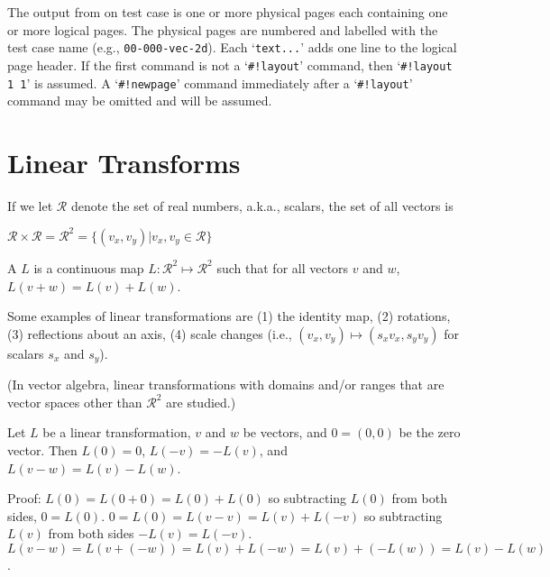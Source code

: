 \documentclass[12pt]{article}
\begin{document}
The output from on test case is one or more physical pages
each containing one or more logical pages.  The physical
pages are numbered and labelled with the test case name
(e.g., {\tt 00-000-vec-2d}).  Each `{\tt text...}' adds one
line to the logical page header.  If the first command is
not a `{\tt \#!layout}' command, then `{\tt \#!layout 1 1}'
is assumed.  A `{\tt \#!newpage}' command immediately after a
`{\tt \#!layout}' command may be omitted and will be assumed.

\newpage

\section{Linear Transforms}
If we let $\mathcal{R}$ denote the set of real numbers,
a.k.a., scalars, the set of all vectors is \\
\centerline{
$\mathcal{R}\times\mathcal{R}=\mathcal{R}^2
    =\{(v_x,v_y)|v_x,v_y\in \mathcal{R}\}$}

\begin{definition}\label{LINEAR-TRANSFORMATION}
A  $L$ is a continuous map
$L:\mathcal{R}^2\mapsto\mathcal{R}^2$ such that for
all vectors $v$ and $w$, $L(v+w)=L(v)+L(w)$.
\end{definition}

Some examples of linear transformations are (1) the identity map,
(2) rotations, (3) reflections about an axis, (4) scale changes
(i.e., $(v_x,v_y)\longmapsto(s_x v_x,s_y v_y)$ for scalars $s_x$
and $s_y$).

(In vector algebra, linear transformations with domains and/or ranges
that are vector spaces other than $\mathcal{R}^2$ are studied.)


\begin{lemma}
Let $L$ be a linear transformation, $v$ and $w$ be vectors,
and $0=(0,0)$ be the zero vector.  Then $L(0)=0$,  $L(-v)=-L(v)$,
and $L(v-w) = L(v) - L(w)$.
\end{lemma}
\begin{indpar}{0.5in}
Proof: $L(0) = L(0+0)= L(0) + L(0)$ so subtracting $L(0)$
from both sides, $0=L(0)$.  $0 = L(0) = L(v-v) = L(v) + L(-v)$
so subtracting $L(v)$ from both sides $-L(v)=L(-v)$.
$L(v-w)=L(v+(-w))=L(v)+L(-w)=L(v)+(-L(w))=L(v)-L(w)$.
\end{indpar}
\end{document}
